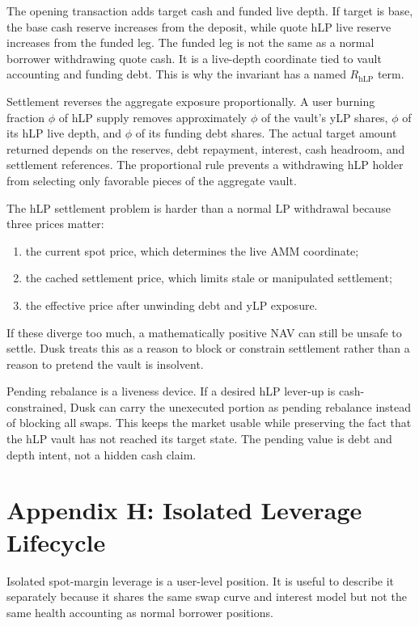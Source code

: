 \documentclass[11pt]{article}
\newcommand{\hlp}{\mathrm{hLP}}
\begin{document}
The opening transaction adds target cash and funded live depth. If target is base, the base cash reserve increases from the deposit, while quote hLP live reserve increases from the funded leg. The funded leg is not the same as a normal borrower withdrawing quote cash. It is a live-depth coordinate tied to vault accounting and funding debt. This is why the invariant has a named $R_{\hlp}$ term.

Settlement reverses the aggregate exposure proportionally. A user burning fraction $\phi$ of hLP supply removes approximately $\phi$ of the vault's yLP shares, $\phi$ of its hLP live depth, and $\phi$ of its funding debt shares. The actual target amount returned depends on the reserves, debt repayment, interest, cash headroom, and settlement references. The proportional rule prevents a withdrawing hLP holder from selecting only favorable pieces of the aggregate vault.

The hLP settlement problem is harder than a normal LP withdrawal because three prices matter:
\begin{enumerate}
  \item the current spot price, which determines the live AMM coordinate;
  \item the cached settlement price, which limits stale or manipulated settlement;
  \item the effective price after unwinding debt and yLP exposure.
\end{enumerate}
If these diverge too much, a mathematically positive NAV can still be unsafe to settle. Dusk treats this as a reason to block or constrain settlement rather than a reason to pretend the vault is insolvent.

Pending rebalance is a liveness device. If a desired hLP lever-up is cash-constrained, Dusk can carry the unexecuted portion as pending rebalance instead of blocking all swaps. This keeps the market usable while preserving the fact that the hLP vault has not reached its target state. The pending value is debt and depth intent, not a hidden cash claim.

\section{Appendix H: Isolated Leverage Lifecycle}

Isolated spot-margin leverage is a user-level position. It is useful to describe it separately because it shares the same swap curve and interest model but not the same health accounting as normal borrower positions.
\end{document}
